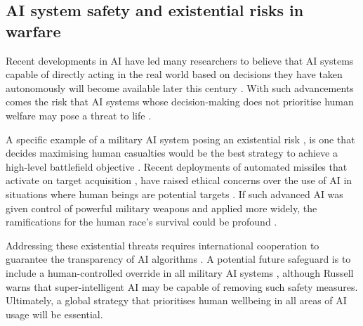 \documentclass[a4paper, 11pt]{article}
\begin{document}
\subsection*{AI system safety and existential risks in warfare}

Recent developments in AI have led many researchers to believe that AI systems capable of directly acting 
in the real world based on decisions they have taken autonomously will become available later this century \cite{Grace2018}. 
With such advancements comes the risk that AI systems whose decision-making does not prioritise human welfare 
may pose a threat to life \cite{Ord2020}. 

A specific example of a military AI system posing an existential risk \cite{yampolskiy2016, Cummings2017}, 
is one that decides maximising human casualties would be the best strategy to achieve a high-level battlefield objective \cite{Barrat2013}. 
Recent deployments of automated missiles that activate on target acquisition \cite{Atherton2021, BodeWatts2023}, 
have raised ethical concerns over the use of AI in situations where human beings are potential targets \cite{Emery2021}. 
If such advanced AI was given control of powerful military weapons and applied more widely, 
the ramifications for the human race's survival could be profound \cite{Tegmark2017}. 

Addressing these existential threats requires international cooperation 
to guarantee the transparency of AI algorithms \cite{Cihon2019, Leslie2019}. 
A potential future safeguard is to include a human-controlled override in all military AI systems \cite{CritchKrueger2020}, 
although Russell \cite{Russell2019} warns that super-intelligent AI may be capable of removing such safety measures. 
Ultimately, a global strategy that prioritises human wellbeing in all areas of AI usage will be essential.

\printbibliography
\end{document}
